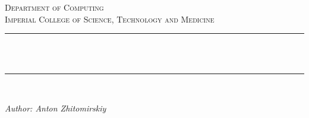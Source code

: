 \begin{titlepage}

    \newcommand{\HRule}{\rule{\linewidth}{0.5mm}} %
    
    \center %
     
    
    \textsc{\Large Department of Computing}\\[0.5cm] 
    \textsc{\large Imperial College of Science, Technology and Medicine}\\[0.5cm] 
    
    
    \HRule \\[0.4cm]
    { \huge \bfseries \reporttitle}\\ %
    \HRule \\[0.4cm]

    \textit{\reportdescription}
    
    \vspace{2em}

    
    \large \emph{Author: Anton Zhitomirskiy}

    \vspace{1em}

    \global\let\newpagegood\newpage
    \global\let\newpage\relax
    
\end{titlepage}

\global\let\newpage\newpagegood